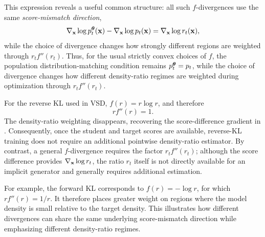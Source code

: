 This expression reveals a useful common structure: all such $f$-divergences
use the same \emph{score-mismatch direction},
\[
\nabla_{{\mathbf{x}}}\log p_t^{{\bm{\theta}}}({\mathbf{x}})
-
\nabla_{{\mathbf{x}}}\log p_t({\mathbf{x}})
=
\nabla_{{\mathbf{x}}}\log r_t({\mathbf{x}}),
\]
while the choice of divergence changes how strongly different regions are
weighted through $r_t f''(r_t)$. Thus, for the usual strictly convex choices of $f$, the population
distribution-matching condition remains $p_t^{{\bm{\theta}}}=p_t$, while the choice
of divergence changes how different density-ratio regimes are weighted during
optimization through $r_t f''(r_t)$.

For the reverse KL used in VSD,
$f(r)=r\log r$, and therefore
\[
r f''(r)=1.
\]
The density-ratio weighting disappears, recovering the score-difference
gradient in . Consequently, once the student and target
scores are available, reverse-KL training does not require an additional
pointwise density-ratio estimator. By contrast, a general $f$-divergence
requires the factor $r_t f''(r_t)$; although the score difference provides
$\nabla_{{\mathbf{x}}}\log r_t$, the ratio $r_t$ itself is not directly available
for an implicit generator and generally requires additional estimation.

For example, the forward KL corresponds to $f(r)=-\log r$, for which
$r f''(r)=1/r$. It therefore places greater weight on regions where the
model density is small relative to the target density. This illustrates how
different divergences can share the same underlying score-mismatch direction
while emphasizing different density-ratio regimes.

